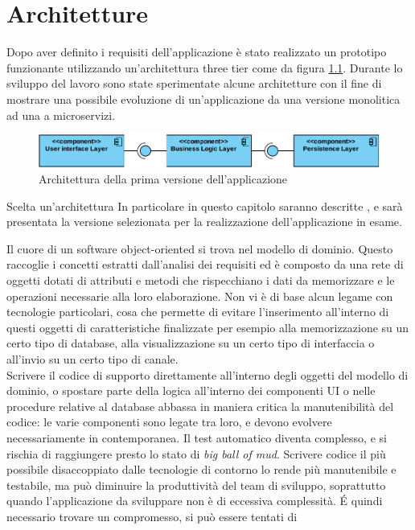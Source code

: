 \chapter{Architetture}

Dopo aver definito i requisiti dell'applicazione è stato realizzato un prototipo funzionante utilizzando un'architettura three tier come da figura \ref{fig:app-version-1}.
Durante lo sviluppo del lavoro sono state sperimentate alcune architetture con il fine di mostrare una possibile evoluzione di un'applicazione da una versione monolitica ad una a microservizi.

\begin{figure}[h]
	\centering
	\includegraphics[width=\textwidth]{img/architecture-01}
	\caption{Architettura della prima versione dell'applicazione}
	\label{fig:app-version-1}
\end{figure}

Scelta un'architettura
In particolare  in questo capitolo saranno descritte , e sarà presentata la versione selezionata per la realizzazione dell'applicazione in esame.

Il cuore di un software object-oriented si trova nel modello di dominio. Questo raccoglie i concetti estratti dall'analisi dei requisiti ed è composto da una rete di oggetti dotati di attributi e metodi che rispecchiano i dati da memorizzare e le operazioni necessarie alla loro elaborazione.
Non vi è di base alcun legame con tecnologie particolari, cosa che permette di evitare l'inserimento all'interno di questi oggetti di caratteristiche finalizzate per esempio alla memorizzazione su un certo tipo di database, alla visualizzazione su un certo tipo di interfaccia o all'invio su un certo tipo di canale.\\
Scrivere il codice di supporto direttamente all'interno degli oggetti del modello di dominio, o spostare parte della logica all'interno dei componenti UI o nelle procedure relative al database abbassa in maniera critica la manutenibilità del codice: le varie componenti sono legate tra loro, e devono evolvere necessariamente in contemporanea.
Il test automatico diventa complesso, e si rischia di raggiungere presto lo stato di \textit{big ball of mud}\cite{microservices_architecture}.
Scrivere codice il più possibile disaccoppiato dalle tecnologie di contorno lo rende più manutenibile e testabile, ma può diminuire la produttività del team di sviluppo, soprattutto quando l'applicazione da sviluppare non è di eccessiva complessità.
\'E quindi necessario trovare un compromesso, si può essere tentati di 

